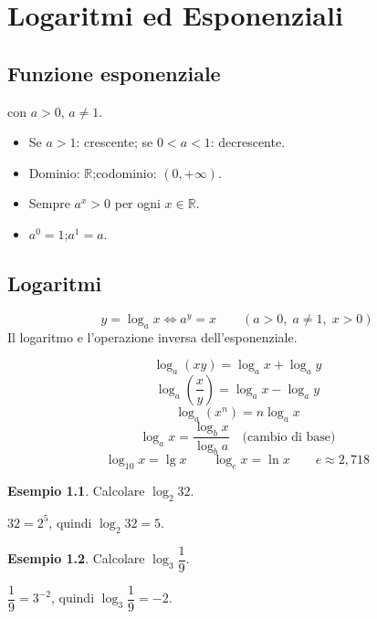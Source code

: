 \documentclass[12pt, a4paper, twoside, openright]{book}
\theoremstyle{definition}
\newtheorem{esempio}{Esempio}[section]
\newcommand{\R}{\mathbb{R}}
\begin{document}
\chapter{Logaritmi ed Esponenziali}

\section{Funzione esponenziale}

\begin{defbox}[Funzione esponenziale $f(x) = a^x$]
con $a > 0$, $a \neq 1$.
\begin{itemize}
  \item Se $a > 1$: crescente; se $0 < a < 1$: decrescente.
  \item Dominio: $\R$;\quad codominio: $(0, +\infty)$.
  \item Sempre $a^x > 0$ per ogni $x \in \R$.
  \item $a^0 = 1$;\quad $a^1 = a$.
\end{itemize}
\end{defbox}

\section{Logaritmi}

\begin{defbox}[Definizione]
\[
y = \log_a x \iff a^y = x \qquad (a > 0,\; a \neq 1,\; x > 0)
\]
Il logaritmo e l'operazione inversa dell'esponenziale.
\end{defbox}

\begin{formulario}
\[
\log_a(xy) = \log_a x + \log_a y
\]
\[
\log_a\!\left(\frac{x}{y}\right) = \log_a x - \log_a y
\]
\[
\log_a(x^n) = n \log_a x
\]
\[
\log_a x = \frac{\log_b x}{\log_b a} \quad \text{(cambio di base)}
\]
\[
\log_{10} x = \lg x \qquad \log_e x = \ln x \qquad e \approx 2{,}718
\]
\end{formulario}

\begin{esempio}
Calcolare $\log_2 32$.

$32 = 2^5$, quindi $\log_2 32 = 5$.
\end{esempio}

\begin{esempio}
Calcolare $\log_3 \dfrac{1}{9}$.

$\dfrac{1}{9} = 3^{-2}$, quindi $\log_3 \dfrac{1}{9} = -2$.
\end{esempio}
\end{document}
